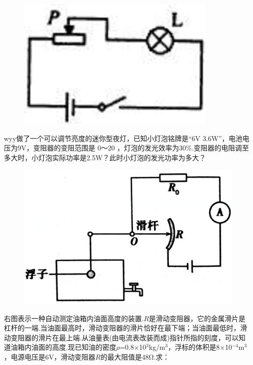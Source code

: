 \documentclass[11pt,a4paper]{article}
\newcommand{\nianfen}[1]{\hspace{-2em}{(#1\textbf{·}\textit{青岛})}}
\begin{document}
{	\rule{0em}{15em}
	
	\begin{figure}
		\includegraphics[width=\linewidth]{2004}
	\end{figure}

	\nianfen{2004}wyy做了一个可以调节亮度的迷你型夜灯，已知小灯泡铭牌是“6V 3.6W”，电池电压为9V，变阻器的变阻范围是
	0～20 ，灯泡的发光效率为30\%.变阻器的电阻调至 多大时，小灯泡实际功率是2.5W？此时小灯泡的发光功率为多大？
	\clearpage
	
	\begin{figure}
		\includegraphics[width=\linewidth]{2003}
		
	\end{figure}

	\nianfen{2003}右图表示一种自动测定油箱内油面高度的装置.$ R $是滑动变阻器，它的金属滑片是杠杆的一端.当油面最高时，滑动变阻器的滑片恰好在最下端；当油面最低时，滑动变阻器的滑片在最上端.从油量表(由电流表改装而成)指针所指的刻度，可以知道油箱内油面的高度.现已知油的密度$\rho$=0.8×10$^3$kg/m$^3$，浮标的体积是8×10$^{-4}$m$^3$，电源电压是6V，滑动变阻器$ R $的最大阻值是48Ω.求：
	
}
\end{document}
